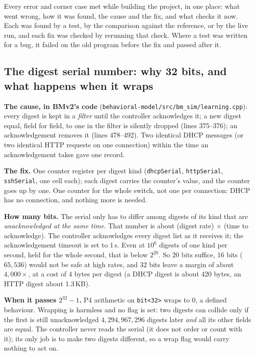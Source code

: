 \documentclass[11pt,a4paper]{article}
\newcommand{\code}[1]{\texttt{#1}}
\begin{document}
Every error and corner case met while building the project, in one place: what went wrong, how it was found, the
cause and the fix, and what checks it now. Each was found by a test, by the comparison against the reference, or by
the live run, and each fix was checked by rerunning that check. Where a test was written for a bug, it failed on
the old program before the fix and passed after it.



\subsection*{The digest serial number: why 32 bits, and what happens when it wraps}
\label{sec:serial}

\textbf{The cause, in BMv2's code} (\code{behavioral-model/src/bm\_sim/learning.cpp}): every digest is kept in a
\emph{filter} until the controller acknowledges it; a new digest equal, field for field, to one in the filter is
silently dropped (lines 375--376); an acknowledgement removes it (lines 478--492). Two identical DHCP messages (or
two identical HTTP requests on one connection) within the time an acknowledgement takes gave one record.

\textbf{The fix.} One counter register per digest kind (\code{dhcpSerial}, \code{httpSerial}, \code{sshSerial}, one cell each); each
digest carries the counter's value, and the counter goes up by one. One counter for the whole switch, not one per
connection: DHCP has no connection, and nothing more is needed.

\textbf{How many bits.} The serial only has to differ among digests of its kind that are \emph{unacknowledged at the
same time}. That number is about (digest rate) $\times$ (time to acknowledge). The controller acknowledges every
digest list as it receives it; the acknowledgement timeout is set to 1\,s. Even at $10^6$ digests of one kind per
second, held for the whole second, that is below $2^{20}$. So 20 bits suffice, 16 bits ($65{,}536$) would not be safe at
high rates, and 32 bits leave a margin of about $4{,}000\times$, at a cost of 4 bytes per digest (a DHCP digest is
about 420 bytes, an HTTP digest about 1.3\,KB).

\textbf{When it passes $2^{32}-1$.} P4 arithmetic on \code{bit<32>} wraps to 0, a defined behaviour. Wrapping is
harmless and no flag is set: two digests can collide only if the first is still unacknowledged
$4{,}294{,}967{,}296$ digests later \emph{and} all its other fields are equal. The controller never reads the serial
(it does not order or count with it); its only job is to make two digests different, so a wrap flag would carry
nothing to act on.
\end{document}
